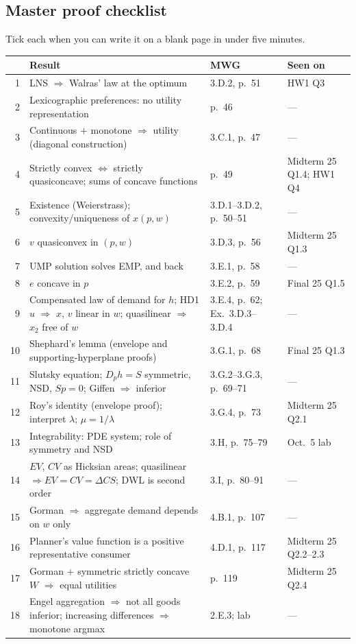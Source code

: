 \documentclass[11pt]{article}
\begin{document}
\subsection{Master proof checklist}
Tick each when you can write it on a blank page in under five minutes.
\begin{center}\small\begin{tabular}{rp{7.4cm}p{3.3cm}p{3.1cm}}\toprule & Result & MWG & Seen on\\\midrule
1 & LNS $\Rightarrow$ Walras' law at the optimum & 3.D.2, p.~51 & HW1 Q3\\
2 & Lexicographic preferences: no utility representation & p.~46 & ---\\
3 & Continuous $+$ monotone $\Rightarrow$ utility (diagonal construction) & 3.C.1, p.~47 & ---\\
4 & Strictly convex $\iff$ strictly quasiconcave; sums of concave functions & p.~49 & Midterm 25 Q1.4; HW1 Q4\\
5 & Existence (Weierstrass); convexity/uniqueness of $x(p,w)$ & 3.D.1--3.D.2, p.~50--51 & ---\\
6 & $v$ quasiconvex in $(p,w)$ & 3.D.3, p.~56 & Midterm 25 Q1.3\\
7 & UMP solution solves EMP, and back & 3.E.1, p.~58 & ---\\
8 & $e$ concave in $p$ & 3.E.2, p.~59 & Final 25 Q1.5\\
9 & Compensated law of demand for $h$; HD1 $u$ $\Rightarrow$ $x$, $v$ linear in $w$; quasilinear $\Rightarrow$ $x_2$ free of $w$ & 3.E.4, p.~62; Ex.~3.D.3--3.D.4 & ---\\
10 & Shephard's lemma (envelope and supporting-hyperplane proofs) & 3.G.1, p.~68 & Final 25 Q1.3\\
11 & Slutsky equation; $D_ph=S$ symmetric, NSD, $Sp=0$; Giffen $\Rightarrow$ inferior & 3.G.2--3.G.3, p.~69--71 & ---\\
12 & Roy's identity (envelope proof); interpret $\lambda$; $\mu=1/\lambda$ & 3.G.4, p.~73 & Midterm 25 Q2.1\\
13 & Integrability: PDE system; role of symmetry and NSD & 3.H, p.~75--79 & Oct.~5 lab\\
14 & $EV$, $CV$ as Hicksian areas; quasilinear $\Rightarrow EV=CV=\Delta CS$; DWL is second order & 3.I, p.~80--91 & ---\\
15 & Gorman $\Rightarrow$ aggregate demand depends on $w$ only & 4.B.1, p.~107 & ---\\
16 & Planner's value function is a positive representative consumer & 4.D.1, p.~117 & Midterm 25 Q2.2--2.3\\
17 & Gorman $+$ symmetric strictly concave $W$ $\Rightarrow$ equal utilities & p.~119 & Midterm 25 Q2.4\\
18 & Engel aggregation $\Rightarrow$ not all goods inferior; increasing differences $\Rightarrow$ monotone argmax & 2.E.3; lab & ---\\
\bottomrule\end{tabular}\end{center}
\end{document}
